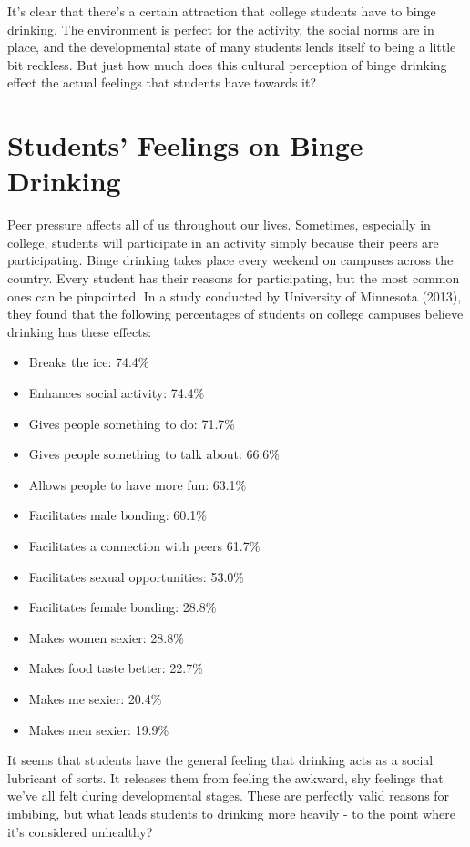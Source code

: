 \documentclass[12pt, man]{apa6}
\begin{document}
It's clear that there's a certain attraction that college students have to binge drinking. The environment is perfect for the activity, the social norms are in place, and the developmental state of many students lends itself to being a little bit reckless. But just how much does this cultural perception of binge drinking effect the actual feelings that students have towards it?

\section{Students' Feelings on Binge Drinking}
Peer pressure affects all of us throughout our lives. Sometimes, especially in college, students will participate in an activity simply because their peers are participating. Binge drinking takes place every weekend on campuses across the country. Every student has their reasons for participating, but the most common ones can be pinpointed. In a study conducted by University of Minnesota (2013), they found that the following percentages of students on college campuses believe drinking has these effects:
\begin{itemize}
	\item Breaks the ice: 74.4\%
	\item Enhances social activity: 74.4\%
	\item Gives people something to do: 71.7\%
	\item Gives people something to talk about: 66.6\%
	\item Allows people to have more fun: 63.1\%
	\item Facilitates male bonding: 60.1\%
	\item Facilitates a connection with peers 61.7\%
	\item Facilitates sexual opportunities: 53.0\%
	\item Facilitates female bonding: 28.8\%
	\item Makes women sexier: 28.8\%
	\item Makes food taste better: 22.7\%
	\item Makes me sexier: 20.4\%
	\item Makes men sexier: 19.9\%
\end{itemize}

It seems that students have the general feeling that drinking acts as a social lubricant of sorts. It releases them from feeling the awkward, shy feelings that we've all felt during developmental stages. These are perfectly valid reasons for imbibing, but what leads students to drinking more heavily - to the point where it's considered unhealthy?
\end{document}
